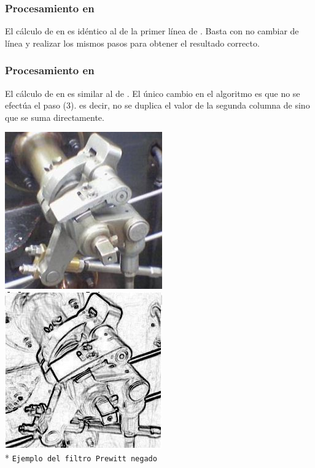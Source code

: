 \subsubsection{Procesamiento en }
	El cálculo de  en  es idéntico al de la primer línea de . Basta con no cambiar de línea y realizar
los mismos pasos para obtener el resultado correcto.

\subsubsection{Procesamiento en }
	El cálculo de  en  es similar al de . El único cambio en el algoritmo es que no se efectúa el paso (3). 
es decir, no se duplica el valor de la segunda columna de  sino que se suma directamente.

\begin{center}
\vspace{1.0cm}
\includegraphics[scale=0.5]{imgs/steam-engine.jpg}
\includegraphics[scale=0.5]{imgs/steam-engine-prewitt-neg.jpg} \\*
\texttt{\small Ejemplo del filtro Prewitt negado } \\
\end{center}

